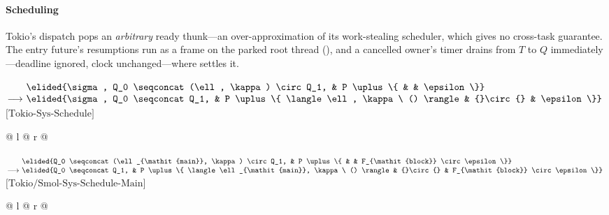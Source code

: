 \paragraph{Scheduling}
Tokio's dispatch pops an \emph{arbitrary} ready thunk---an over-approximation of its work-stealing scheduler, which gives no cross-task  guarantee. The entry future's resumptions run as a frame on the parked root thread (), and a cancelled owner's timer drains from $T$ to $Q$ immediately---deadline ignored, clock unchanged---where  settles it.

\noindent
$\begin{array}[t]{@{}r@{\ }l@{\ }l@{}l@{}l@{}}
                & \elided{\sigma, Q_0 \seqconcat (\ell, \kappa) \circ Q_1, & P \uplus \{ & & \epsilon \}} \\
\longrightarrow & \elided{\sigma, Q_0 \seqconcat Q_1, & P \uplus \{ \langle \ell, \kappa\ () \rangle & {}\circ{} & \epsilon \}}
\end{array}$\hfill$\text{[Tokio-Sys-Schedule]}$\par
\noindent
\begin{tabular*}{\linewidth}{@{} l @{\extracolsep{\fill}} r @{}}
\end{tabular*}

\vspace{1em}
\noindent
$\begin{array}[t]{@{}r@{\ }l@{\ }l@{}l@{}l@{}}
                & \elided{Q_0 \seqconcat (\ell_{\mathit{main}}, \kappa) \circ Q_1, & P \uplus \{ & & F_{\mathit{block}} \circ \epsilon \}} \\
\longrightarrow & \elided{Q_0 \seqconcat Q_1, & P \uplus \{ \langle \ell_{\mathit{main}}, \kappa\ () \rangle & {}\circ{} & F_{\mathit{block}} \circ \epsilon \}}
\end{array}$\hfill$\text{[Tokio/Smol-Sys-Schedule-Main]}$\par
\noindent
\begin{tabular*}{\linewidth}{@{} l @{\extracolsep{\fill}} r @{}}
\end{tabular*}

